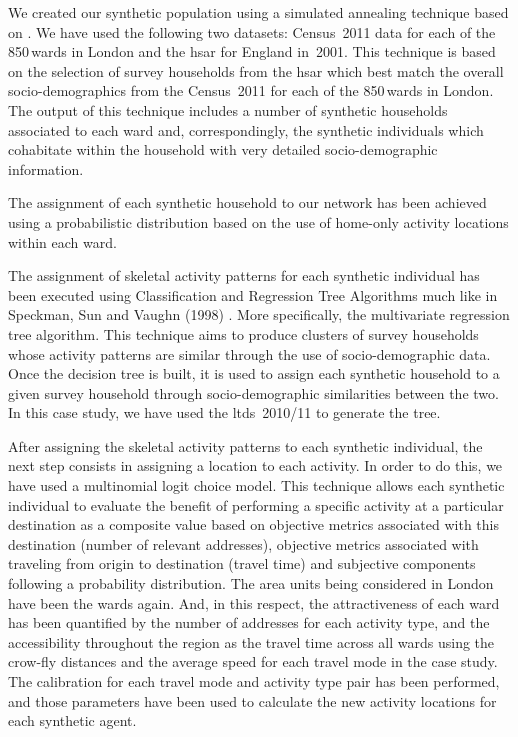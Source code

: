 We created our synthetic population using a simulated annealing technique based on \citet[][]{metropolissampling}. We have used the following two datasets: Census~2011 data for each of the 850\,wards in London and the \gls{hsar} for England in~2001. This technique is based on the selection of survey households from the \gls{hsar} which best match the overall socio-demographics from the Census~2011 for each of the 850\,wards in London. The output of this technique includes a number of synthetic households associated to each ward and, correspondingly, the synthetic individuals which cohabitate within the household with very detailed socio-demographic information.

The assignment of each synthetic household to our network has been achieved using a probabilistic distribution based on the use of home-only activity locations within each ward.

The assignment of skeletal activity patterns for each synthetic individual has been executed using Classification and Regression Tree Algorithms much like in Speckman, Sun and Vaughn (1998) . 
More specifically, the multivariate regression tree algorithm. 
This technique aims to produce clusters of survey households whose activity patterns are similar through the use of socio-demographic data. 
Once the decision tree is built, it is used to assign each synthetic household to a given survey household through socio-demographic similarities between the two. 
In this case study, we have used the \gls{ltds}~2010/11 to generate the tree.

After assigning the skeletal activity patterns to each synthetic individual, the next step consists in assigning a location to each activity. 
In order to do this, we have used a multinomial logit choice model. This technique allows each synthetic individual to evaluate the benefit of performing a specific activity at a particular destination as a composite value based on objective metrics associated with this destination (\eg number of relevant addresses), objective metrics associated with traveling from origin to destination (\eg travel time) and subjective components following a probability distribution. The area units being considered in London have been the wards again. And, in this respect, the attractiveness of each ward has been quantified by the number of addresses for each activity type, and the accessibility throughout the region as the travel time across all wards using the crow-fly distances and the average speed for each travel mode in the case study. The calibration for each travel mode and activity type pair has been performed, and those parameters have been used to calculate the new activity locations for each synthetic agent.

